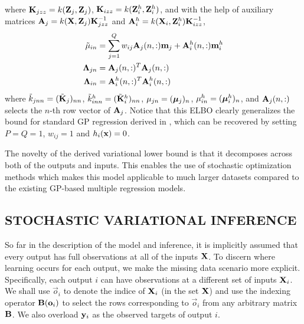 where $\mathbf{K}_{jzz} = k(\mathbf{Z}_j, \mathbf{Z}_j)$, $\mathbf{K}_{izz} = k(\mathbf{Z}^h_i, \mathbf{Z}^h_i)$, and with the help of auxiliary matrices $\mathbf{A}_j = k(\mathbf{X},\mathbf{Z}_j) \mathbf{K}_{jzz}^{-1}$ and $\mathbf{A}^h_i = k(\mathbf{X}_i,\mathbf{Z}^h_i)\mathbf{K}_{izz}^{-1}$, 
\begin{align}
\tilde{\mu}_{in}
&= \sum_{j=1}^Q w_{ij} \mathbf{A}_j(n,:) \mathbf{m}_j + \mathbf{A}^h_i(n,:) \mathbf{m}^h_i \\
\mathbf{\Lambda}_{jn}
&= \mathbf{A}_j(n,:)^T \mathbf{A}_j(n,:)  \\
\mathbf{\Lambda}_{in}
&= \mathbf{A}^h_i(n,:)^T \mathbf{A}^h_i(n,:) 
\end{align}
where $\tilde{k}_{jnn} = (\tilde{\mathbf{K}}_j)_{nn}$, $\tilde{k}^h_{inn} = (\tilde{\mathbf{K}}^h_i)_{nn}$, $\mu_{jn} = (\boldsymbol{\mu}_j)_n$,  $\mu^h_{in} = (\boldsymbol{\mu}^h_i)_n$, and $\mathbf{A}_j(n,:)$ selects the $n$-th row vector of $\mathbf{A}_j$. 
Notice that this ELBO clearly generalizes the bound for standard GP regression derived in \citep{hensmangaussian}, which can be recovered by setting $P = Q = 1$, $w_{ij} = 1$ and $h_i(\mathbf{x}) = 0$.

The novelty of the derived variational lower bound is that it decomposes across both of the outputs and inputs.
This enables the use of stochastic optimization methods which makes this model applicable to much larger datasets compared to the existing GP-based multiple regression models. 

\subsection{STOCHASTIC VARIATIONAL INFERENCE}
\newcommand{\oi}{\vec{o}_i}

So far in the description of the model and inference, it is implicitly assumed that every output has full observations at all of the inputs $\mathbf{X}$.
To discern where learning occurs for each output, we make the missing data scenario more explicit.
Specifically, each output $i$ can have observations at a different set of inputs $\mathbf{X}_i$. 
We shall use $\oi$ to denote the indice of $\mathbf{X}_i$ (in the set $\mathbf{X}$) and use the indexing operator $\B(\oi)$ to select the rows corresponding to $\oi$ from any arbitrary matrix $\mathbf{B}$.
We also overload $\mathbf{y}_i$ as the observed targets of output $i$. 

